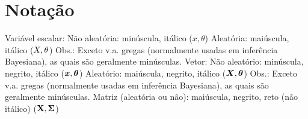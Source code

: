 
\chapter*{Notação}

\begin{outline}
	\1 Variável escalar: 
		\2 Não aleatória: minúscula, itálico ($x, \theta$)
		\2 Aleatória: maiúscula, itálico ($X, \theta$)
			\3 Obs.: Exceto v.a. gregas (normalmente usadas em inferência Bayesiana), as quais são geralmente minúsculas.
	\1 Vetor: 
		\2 Não aleatório: minúscula, negrito, itálico ($\bm{x}, \bm{\theta}$)
		\2 Aleatório: maiúscula, negrito, itálico ($\bm{X}, \bm{\theta}$)
		\3 Obs.: Exceto v.a. gregas (normalmente usadas em inferência Bayesiana), as quais são geralmente minúsculas.
	\1 Matriz (aleatória ou não): maiúscula, negrito, reto (não itálico) ($\mathbf{X}, \mathbf{\Sigma}$)
\end{outline}